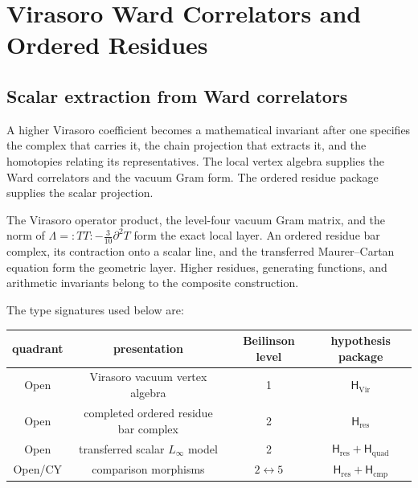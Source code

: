 
\providecommand{\cA}{\mathcal A}
\providecommand{\cW}{\mathcal W}
\providecommand{\Vir}{\mathrm{Vir}}
\providecommand{\MC}{\mathrm{MC}}
\providecommand{\Res}{\operatorname{Res}}
\providecommand{\ClaimStatusProvedHere}{}
\providecommand{\ClaimStatusConditional}{}
\providecommand{\ClaimStatusDefinitional}{}
\providecommand{\ClaimStatusOpen}{}

\chapter{Virasoro Ward Correlators and Ordered Residues}
\label{ch:shadow-tower-higher-coefficients}
\label{chap:shadow-tower-higher-coefficients}

\section*{Scalar extraction from Ward correlators}

A higher Virasoro coefficient becomes a mathematical invariant after
one specifies the complex that carries it, the chain projection that
extracts it, and the homotopies relating its representatives.  The
local vertex algebra supplies the Ward correlators and the vacuum Gram
form.  The ordered residue package supplies the scalar projection.

The Virasoro operator product, the level-four vacuum Gram matrix, and
the norm of
\(\Lambda={:}TT{:}-\frac{3}{10}\partial^2T\)
form the exact local layer.  An ordered residue bar complex, its
contraction onto a scalar line, and the transferred Maurer--Cartan
equation form the geometric layer.  Higher residues, generating
functions, and arithmetic invariants belong to the composite
construction.

The type signatures used below are:

\begin{center}
\begin{tabular}{c|c|c|c}
quadrant & presentation & Beilinson level & hypothesis package\\
\hline
Open & Virasoro vacuum vertex algebra & 1 & $\mathsf H_{\Vir}$\\
Open & completed ordered residue bar complex & 2 &
 $\mathsf H_{\mathrm{res}}$\\
Open & transferred scalar $L_\infty$ model & 2 &
 $\mathsf H_{\mathrm{res}}+\mathsf H_{\mathrm{quad}}$\\
Open/CY & comparison morphisms & $2\leftrightarrow 5$ &
 $\mathsf H_{\mathrm{res}}+\mathsf H_{\mathrm{cmp}}$
\end{tabular}
\end{center}


